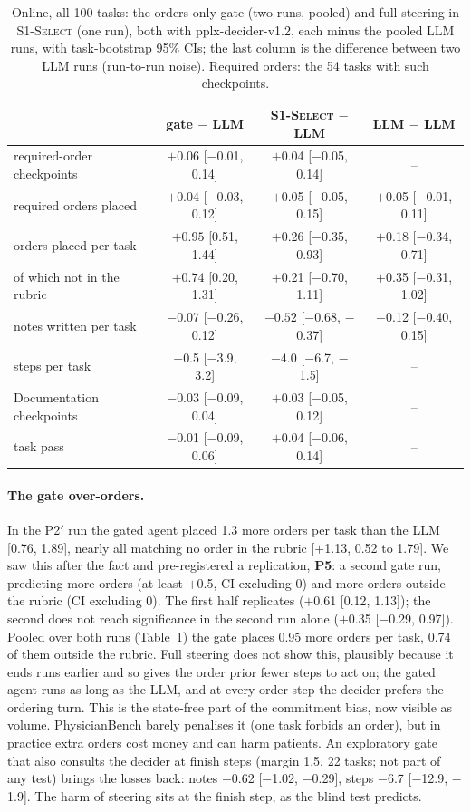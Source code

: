 \documentclass[11pt]{article}
\newcommand{\sel}{\textsc{S1-Select}}
\begin{document}
\begin{table}[t]
\centering\small
\caption{Online, all 100 tasks: the orders-only gate (two runs, pooled) and full steering in \sel{} (one run), both with
pplx-decider-v1.2, each minus the pooled LLM runs, with task-bootstrap 95\% CIs; the last column is the difference between two LLM runs
(run-to-run noise). Required orders: the 54 tasks with such checkpoints.}\label{tab:gate}
\begin{tabular}{lccc}
\toprule
& gate $-$ LLM & \sel{} $-$ LLM & LLM $-$ LLM \\
\midrule
required-order checkpoints & $+$0.06 [$-$0.01, 0.14] & $+$0.04 [$-$0.05, 0.14] & -- \\
required orders placed & $+$0.04 [$-$0.03, 0.12] & $+$0.05 [$-$0.05, 0.15] & $+$0.05 [$-$0.01, 0.11] \\
orders placed per task & $\mathbf{+0.95}$ [0.51, 1.44] & $+$0.26 [$-$0.35, 0.93] & $+$0.18 [$-$0.34, 0.71] \\
\quad of which not in the rubric & $\mathbf{+0.74}$ [0.20, 1.31] & $+$0.21 [$-$0.70, 1.11] & $+$0.35 [$-$0.31, 1.02] \\
notes written per task & $-$0.07 [$-$0.26, 0.12] & $\mathbf{-0.52}$ [$-$0.68, $-$0.37] & $-$0.12 [$-$0.40, 0.15] \\
steps per task & $-$0.5 [$-$3.9, 3.2] & $\mathbf{-4.0}$ [$-$6.7, $-$1.5] & -- \\
Documentation checkpoints & $-$0.03 [$-$0.09, 0.04] & $+$0.03 [$-$0.05, 0.12] & -- \\
task pass & $-$0.01 [$-$0.09, 0.06] & $+$0.04 [$-$0.06, 0.14] & -- \\
\bottomrule
\end{tabular}
\end{table}

\paragraph{The gate over-orders.} In the P2$'$ run the gated agent placed 1.3 more orders per task than the LLM
[0.76, 1.89], nearly all matching no order in the rubric [$+$1.13, 0.52 to 1.79]. We saw this after the fact and
pre-registered a replication, \textbf{P5}: a second gate run, predicting more orders (at least $+$0.5, CI excluding 0)
and more orders outside the rubric (CI excluding 0). The first half replicates ($+$0.61 [0.12, 1.13]); the second
does not reach significance in the second run alone ($+$0.35 [$-$0.29, 0.97]). Pooled over both runs
(Table~\ref{tab:gate}) the gate places 0.95 more orders per task, 0.74 of them outside the rubric. Full steering does not show this, plausibly because it ends runs
earlier and so gives the order prior fewer steps to act on; the gated agent runs as long as the LLM, and at every
order step the decider prefers the ordering turn. This is the state-free part of the commitment bias, now visible as
volume. PhysicianBench barely penalises it (one task forbids an order), but in practice extra orders cost money and
can harm patients.
An exploratory gate that also consults the decider at finish steps (margin 1.5, 22 tasks; not part of any test)
brings the losses back: notes $-$0.62 [$-$1.02, $-$0.29], steps $-$6.7 [$-$12.9, $-$1.9]. The harm of steering
sits at the finish step, as the blind test predicts.
\FloatBarrier
\end{document}
